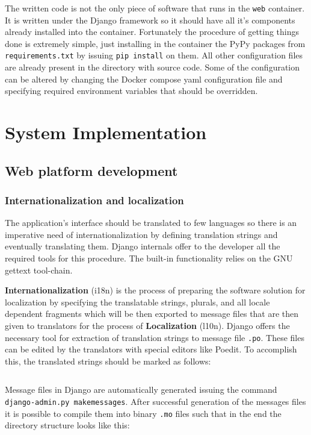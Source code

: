 \documentclass[12pt,oneside,a4paper]{article}
\begin{document}
The written code is not the only piece of software that runs in the \texttt{web} container. It is written under the Django framework so it should have all it's components already installed into the container. Fortunately the procedure of getting things done is extremely simple, just installing in the container the PyPy packages from \texttt{requirements.txt} by issuing \texttt{pip install} on them. All other configuration files are already present in the directory with source code. Some of the configuration can be altered by changing the Docker compose yaml configuration file and specifying required environment variables that should be overridden.

\newpage
\section{System Implementation}
\subsection{Web platform development}
\subsubsection{Internationalization and localization}
The application's interface should be translated to few languages so there is an imperative need of internationalization by defining translation strings and eventually translating them. Django internals offer to the developer all the required tools for this procedure. The built-in functionality relies on the GNU gettext tool-chain.

\textbf{Internationalization} (i18n) is the process of preparing the software solution for localization by specifying the translatable strings, plurals, and all locale dependent fragments which will be then exported to message files that are then given to translators for the process of \textbf{Localization} (l10n). Django offers the necessary tool for extraction of translation strings to message file \texttt{.po}. These files can be edited by the translators with special editors like Poedit. To accomplish this, the translated strings should be marked as follows:
\inputminted[linenos,baselinestretch=1,xleftmargin=0.5cm]{python}{src/i18n-1.py}

Message files in Django are automatically generated issuing the command \texttt{django-admin.py makemessages}. After successful generation of the messages files it is possible to compile them into binary \texttt{.mo} files such that in the end the directory structure looks like this:
\end{document}
